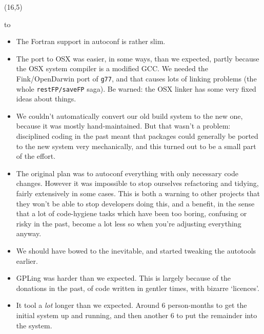 \documentclass[a0]{a0poster}
\def\Head#1{\noindent\hbox to \hsize{\hfil{\LARGE\color{DarkBlue} #1}}\bigskip}
\begin{document}
\begin{textblock}{7}(16,5)

\Head{Lessons and Warnings}

\begin{itemize}
\item The Fortran support in autoconf is rather slim.

\item The port to OSX was easier, in some ways, than we expected,
  partly because the OSX system compiler is a modified GCC.  We needed
  the Fink/OpenDarwin port of \texttt{g77}, and that causes lots of
  linking problems (the whole \texttt{restFP/saveFP} saga).  Be
  warned: the OSX linker has some very fixed ideas about things.

\item We couldn't automatically convert our old build system to the
  new one, because it was mostly hand-maintained.  But that wasn't a
  problem: disciplined coding in the past meant that packages could
  generally be ported to the new system very mechanically, and this
  turned out to be a small part of the effort.

\item The original plan was to autoconf everything with only necessary
  code changes.  However it was impossible to stop ourselves
  refactoring and tidying, fairly extensively in some cases.  This is
  both a warning to other projects that they won't be able to stop
  developers doing this, and a benefit, in the sense that a lot of
  code-hygiene tasks which have been too boring, confusing or risky in
  the past, become a lot less so when you're adjusting everything
  anyway.

\item We should have bowed to the inevitable, and started tweaking the
  autotools earlier.

\item GPLing was harder than we expected.  This is largely because of
  the donations in the past, of code written in gentler times, with
  bizarre `licences'.

\item It tool a \emph{lot} longer than we expected.  Around 6
  person-months to get the initial system up and running, and then
  another 6 to put the remainder into the system.

\end{itemize}

\end{textblock}
\end{document}
